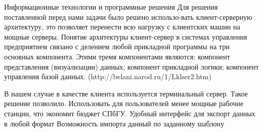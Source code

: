 \documentclass[12pt]{article}
\begin{document}
              Информационные технологии и программные решения
              Для решения поставленной перед нами задачи было решено использо-вать клиент-серверную архитектуру, это позволяет перенести всю нагрузку с клиентских машин на мощные серверы. Понятие архитектуры клиент-сервер в системах управления предприятием связано с делением любой прикладной программы на три основных компонента. Этими тремя компонентами являются:
              компонент представления (визуализации) данных;
              компонент прикладной логики;
              компонент управления базой данных. (http://belani.narod.ru/1/Lklser2.htm)

              В нашем случае в качестве клиента используется терминальный сервер.  Такое решение позволило. Использовать для пользователей менее мощные рабочие станции, что экономит бюджет СПбГУ.
              Удобный интерфейс для экспорт данных в любой формат
              Возможность импорта данный по заданному шаблону
\end{document}
